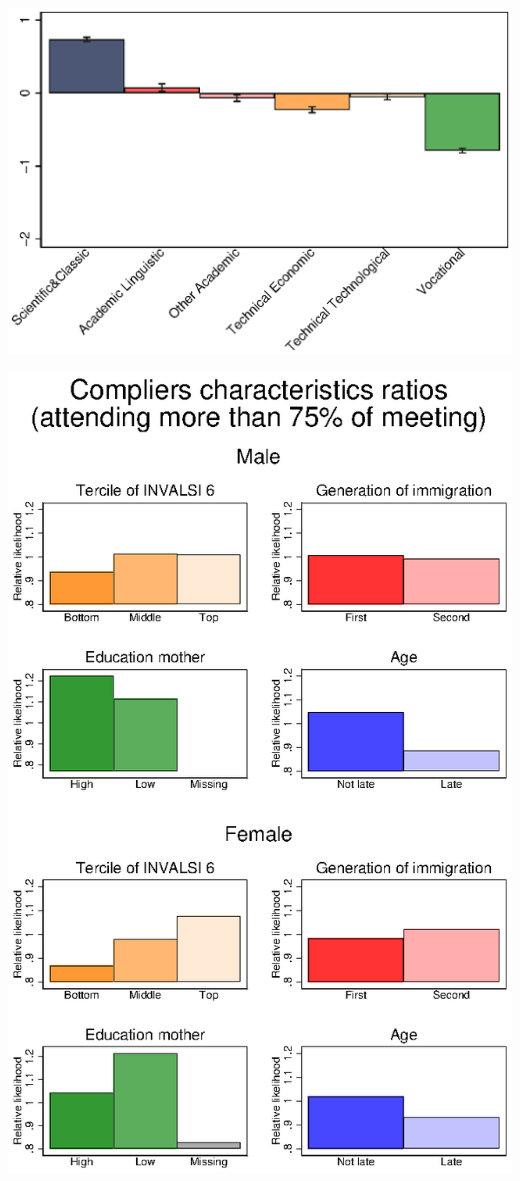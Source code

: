 \documentclass[12pt]{article}
\begin{document}
\includegraphics[scale=1.2]{Figure_choice_test_f.eps}

\includegraphics[scale=1.4]{Figure_compliers_f.eps}
\end{document}
